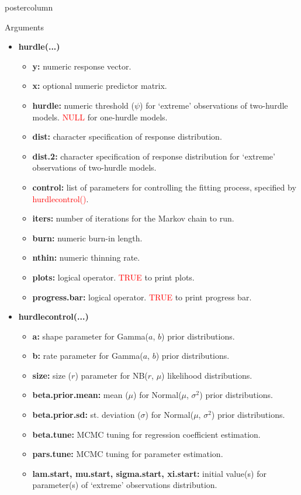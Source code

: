 \documentclass[final]{beamer}\usepackage[]{graphicx}\usepackage[]{color}
\newcommand{\red}{\textcolor{red}}
\begin{document}
{\begin{frame}
\begin{columns}
\begin{column}{.33\textwidth}
\begin{beamercolorbox}[center,wd=\textwidth]{postercolumn}
\begin{minipage}[T]{.97\textwidth}
{\begin{block}{Arguments}
\begin{itemize}
	\item \textbf{hurdle(...)}
	\begin{itemize}
		\item \textbf{y:} numeric response vector.
		\item \textbf{x:} optional numeric predictor matrix.
		\item \textbf{hurdle:} numeric threshold ($\psi$) for `extreme' observations of two-hurdle models. \red{NULL} for one-hurdle models.
		\item \textbf{dist:} character specification of response distribution.
		\item \textbf{dist.2:} character specification of response distribution for `extreme' observations of two-hurdle models.
		\item \textbf{control:} list of parameters for controlling the fitting process, specified by \red{hurdle\textunderscore control()}.
		\item \textbf{iters:} number of iterations for the Markov chain to run. 
		\item \textbf{burn:} numeric burn-in length.
		\item \textbf{nthin:} numeric thinning rate.
		\item \textbf{plots:} logical operator. \red{TRUE} to print plots. 
		\item \textbf{progress.bar:} logical operator. \red{TRUE} to print progress bar. 
	\end{itemize}
  \vspace{0.75cm}
	\item \textbf{hurdle\textunderscore control(...)}
	\begin{itemize}
		\item \textbf{a:} shape parameter for Gamma($a$, $b$) prior distributions.
		\item \textbf{b:} rate parameter for Gamma($a$, $b$) prior distributions.
		\item \textbf{size:} size ($r$) parameter for NB($r$, $\mu$) likelihood distributions.
		\item \textbf{beta.prior.mean:} mean ($\mu$) for Normal($\mu$, $\sigma^{2}$) prior distributions.
		\item \textbf{beta.prior.sd:} st. deviation ($\sigma$) for Normal($\mu$, $\sigma^{2}$) prior distributions.
		\item \textbf{beta.tune:} MCMC tuning for regression coefficient estimation.
		\item \textbf{pars.tune:} MCMC tuning for parameter estimation.
		\item \textbf{lam.start, mu.start, sigma.start, xi.start:} initial value(s) for parameter(s) of `extreme' observations distribution.
	\end{itemize}
\end{itemize}






\end{block}}
\end{minipage}
\end{beamercolorbox}
\end{column}
\end{columns}
\end{frame}}
\end{document}
